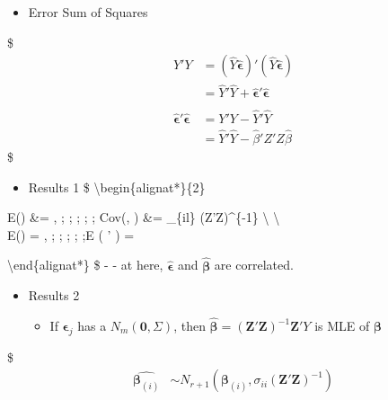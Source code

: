 \documentclass[
]{book}
\providecommand{\tightlist}{%
  \setlength{\itemsep}{0pt}\setlength{\parskip}{0pt}}
\begin{document}
{{\begin{itemize}
\tightlist
\item
  Error Sum of Squares
\end{itemize}

\$
\begin{align*}

Y'Y &= (\hat Y \hat {\pmb \epsilon} ) ' (\hat Y \hat {\pmb \epsilon} ) \\
&= \hat Y ' \hat Y  + \hat{\pmb \epsilon}' \hat{\pmb \epsilon} \\

\\  

\hat {\pmb \epsilon}' \hat {\pmb \epsilon}&= Y'Y - \hat Y ' \hat Y \\

&= \hat Y ' \hat Y - \hat \beta ' Z' Z \hat \beta 


\end{align*}
\$

\begin{itemize}
\tightlist
\item
  Results 1
  \$
  \textbackslash begin\{alignat*\}\{2\}
\end{itemize}

E(\hat {\pmb \beta}) \&= \pmb \beta, ; ; ; ; ; Cov(, ) \&= \sigma\_\{il\} (\pmb Z'\pmb Z)\^{}\{-1\} \textbackslash{}
\textbackslash{}\\
E(\hat {\pmb \epsilon}) = , ; ; ; ; ;E \left( \hat {\pmb \epsilon}'\hat {\pmb \epsilon} \right) = \Sigma

\textbackslash end\{alignat*\}
\$
- - at here, \(\hat {\pmb \epsilon}\) and \(\hat {\pmb \beta}\) are correlated.

\begin{itemize}
\tightlist
\item
  Results 2

  \begin{itemize}
  \tightlist
  \item
    If \(\pmb \epsilon_j\) has a \(N_m (\pmb 0 , \Sigma)\), then \(\hat {\pmb \beta}= (\pmb Z ' \pmb Z )^{-1}\pmb Z 'Y\) is MLE of \(\pmb \beta\)
  \end{itemize}
\end{itemize}

\$
\begin{align*}

\hat {\pmb \beta_{(i)}} &\sim N_{r+1} ({\pmb \beta_{(i)}}, \sigma_{ii} (\pmb Z ' \pmb Z )^{-1}) \\


\end{align*}}}
\end{document}

